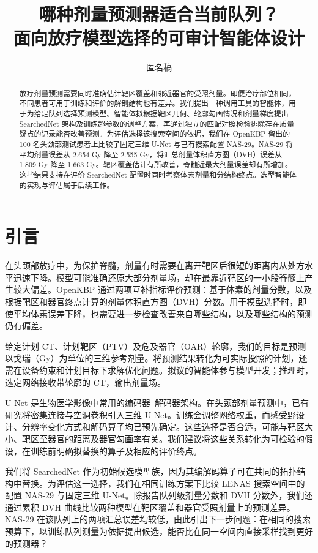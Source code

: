 \documentclass[UTF8,letterpaper,twocolumn,11pt,fontset=fandol]{ctexart}
\title{哪种剂量预测器适合当前队列？\\面向放疗模型选择的可审计智能体设计}
\author{匿名稿}
\date{}
\begin{document}
\maketitle

\begin{abstract}
放疗剂量预测需要同时准确估计靶区覆盖和邻近器官的受照剂量。即便治疗部位相同，不同患者可用于训练和评价的解剖结构也有差异。我们提出一种调用工具的智能体，用于为给定队列选择预测模型。智能体拟根据靶区几何、轮廓勾画情况和剂量梯度提出 SearchedNet 架构及训练超参数的调整方案，再通过独立的匹配对照检验排除存在质量疑点的记录能否改善预测。为评估选择该搜索空间的依据，我们在 OpenKBP 留出的 100 名头颈部测试患者上比较了固定三维 U-Net 与已有搜索配置 NAS-29。NAS-29 将平均剂量误差从 2.654 Gy 降至 2.555 Gy，将汇总剂量体积直方图（DVH）误差从 1.809 Gy 降至 1.663 Gy。靶区覆盖估计有所改善，脊髓近最大剂量误差却有所增加。这些结果支持在评价 SearchedNet 配置时同时考察体素剂量和分结构终点。选型智能体的实现与评估属于后续工作。
\end{abstract}

\section{引言}
在头颈部放疗中，为保护脊髓，剂量有时需要在离开靶区后很短的距离内从处方水平迅速下降。模型可能准确还原大部分剂量场，却在最靠近靶区的一小段脊髓上产生较大偏差。OpenKBP 通过两项互补指标评价预测：基于体素的剂量分数，以及根据靶区和器官终点计算的剂量体积直方图（DVH）分数\citep{openkbp}。用于模型选择时，即使平均体素误差下降，也需要进一步检查改善来自哪些结构，以及哪些结构的预测仍有偏差。

给定计划 CT、计划靶区（PTV）及危及器官（OAR）轮廓，我们的目标是预测以戈瑞（Gy）为单位的三维参考剂量。将预测结果转化为可实际投照的计划，还需在设备约束和计划目标下求解优化问题\citep{planning}。拟议的智能体参与模型开发；推理时，选定网络接收带轮廓的 CT，输出剂量场。

U-Net 是生物医学影像中常用的编码器–解码器架构\citep{unet}。在头颈部剂量预测中，已有研究将密集连接与空洞卷积引入三维 U-Net\citep{gronberg}。训练会调整网络权重，而感受野设计、分辨率变化方式和解码算子均已预先确定。这些选择是否合适，可能与靶区大小、靶区至器官的距离及器官勾画率有关。我们建议将这些关系转化为可检验的假设，在训练前明确拟替换的算子及相应的评价终点。

我们将 SearchedNet 作为初始候选模型族，因为其编解码算子可在共同的拓扑结构中替换。为评估这一选择，我们在相同训练方案下比较 LENAS 搜索空间中的配置 NAS-29\citep{lenas} 与固定三维 U-Net。除报告队列级剂量分数和 DVH 分数外，我们还通过累积 DVH 曲线比较两种模型在靶区覆盖和器官受照剂量上的预测差异。NAS-29 在该队列上的两项汇总误差均较低，由此引出下一步问题：在相同的搜索预算下，以训练队列测量为依据提出候选，能否比在同一空间内直接采样找到更好的预测器？
\end{document}
